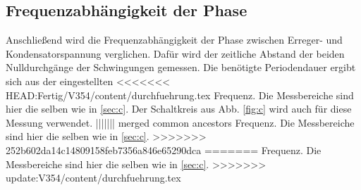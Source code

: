 \subsection{Frequenzabhängigkeit der Phase}
Anschließend wird die Frequenzabhängigkeit der Phase zwischen Erreger- und Kondensatorspannung verglichen. Dafür 
wird der zeitliche Abstand der beiden Nulldurchgänge der Schwingungen gemessen. Die benötigte Periodendauer ergibt sich aus der eingestellten
<<<<<<< HEAD:Fertig/V354/content/durchfuehrung.tex
Frequenz. Die Messbereiche sind hier die selben wie in \ref{sec:c}.
Der Schaltkreis aus Abb. \ref{fig:c} wird auch für diese Messung verwendet.
||||||| merged common ancestors
Frequenz. Die Messbereiche sind hier die selben wie in \ref{sec:c}.
>>>>>>> 252b602da14c14809158feb7356a846e65290dca
=======
Frequenz. Die Messbereiche sind hier die selben wie in \ref{sec:c}.
>>>>>>> update:V354/content/durchfuehrung.tex
